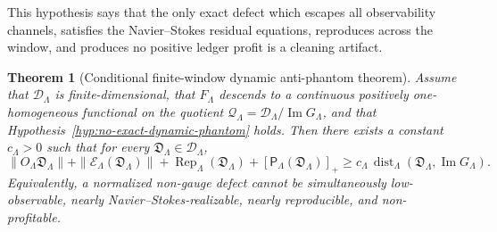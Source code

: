 \documentclass[11pt]{article}
\numberwithin{equation}{section}
\newtheorem{theorem}{Theorem}[section]
\begin{document}
This hypothesis says that the only exact defect which escapes all
observability channels, satisfies the Navier--Stokes residual equations,
reproduces across the window, and produces no positive ledger profit is a
cleaning artifact.

\begin{theorem}[Conditional finite-window dynamic anti-phantom theorem]
\label{thm:conditional-dynamic-anti-phantom}
Assume that \(\mathcal D_\Lambda\) is finite-dimensional, that
\(F_\Lambda\) descends to a continuous positively one-homogeneous
functional on the quotient
\(\mathcal Q_\Lambda=\mathcal D_\Lambda/\operatorname{Im}G_\Lambda\), and
that Hypothesis~\ref{hyp:no-exact-dynamic-phantom} holds.  Then there
exists a constant \(c_\Lambda>0\) such that for every
\(\mathfrak D_\Lambda\in\mathcal D_\Lambda\),
\[
\boxed{
        \|O_\Lambda\mathfrak D_\Lambda\|
        +
        \|\mathcal E_\Lambda(\mathfrak D_\Lambda)\|
        +
        \operatorname{Rep}_\Lambda(\mathfrak D_\Lambda)
        +
        [\mathsf P_\Lambda(\mathfrak D_\Lambda)]_+
        \ge
        c_\Lambda\,
        \operatorname{dist}_\Lambda
        (\mathfrak D_\Lambda,\operatorname{Im}G_\Lambda).
}
\]
Equivalently, a normalized non-gauge defect cannot be simultaneously
low-observable, nearly Navier--Stokes-realizable, nearly reproducible, and
non-profitable.
\end{theorem}
\end{document}
